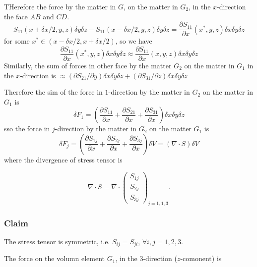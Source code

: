THerefore the force by the matter in $G$, on the matter in $G_{2}$, in the $x$-direction the face $AB$ and $CD$.
\begin{equation}
S_{11} (x+\delta x/2, y, z)\delta y\delta z - S_{11} (x-\delta x/2, y, z)\delta y\delta z
= \frac{\partial S_{11}}{\partial x}(x^{*},y,z) \delta x\delta y\delta z
\end{equation}
for some $x^{*}\in \left(x-\delta x/2, x+\delta x/2\right)$, so we have
\begin{equation}
\frac{\partial S_{11}}{\partial x}(x^{*},y,z) \delta x\delta y\delta z \approx \frac{\partial S_{11}}{\partial x}(x,y,z) \delta x\delta y\delta z
\end{equation}
Similarly, the sum of forces in other face by the matter $G_2$ on the matter in $G_{1}$ in the $x$-direction is $\approx (\partial S_{21}/\partial y)\delta x\delta y\delta z + (\partial S_{31}/\partial z)\delta x\delta y\delta z$

Therefore the sim of the force in $1$-direction by the matter in $G_2$ on the matter in $G_{1}$ is 
\begin{equation}
\delta F_{1} = \left(\frac{\partial S_{11}}{\partial x} + \frac{\partial S_{21}}{\partial x} + \frac{\partial S_{31}}{\partial x}\right) \delta x \delta y \delta z
\end{equation}
sso the force in $j$-direction by the matter in $G_2$ on the matter $G_1$ is 
\begin{equation}
\delta F_{j} = \left(\frac{\partial S_{1j}}{\partial x} + \frac{\partial S_{2j}}{\partial x} + \frac{\partial S_{3j}}{\partial x}\right) \delta V = (\nabla\cdot S)  \delta V
\end{equation}
where the divergence of stress tensor is 


\begin{equation}
\nabla \cdot S = \nabla \cdot \begin{pmatrix}
S_{1j}\\ S_{2j} \\ S_{3j}
\end{pmatrix}_{j=1,1,3}.
\end{equation}

\subsubsection{Claim} %

The stress tensor is symmetric, i.e. $S_{ij} = S_{ji}$, $\forall i,j= 1,2,3$.


The force on the volumn element $G_1$, in the $3$-direction ($z$​-comonent) is 
